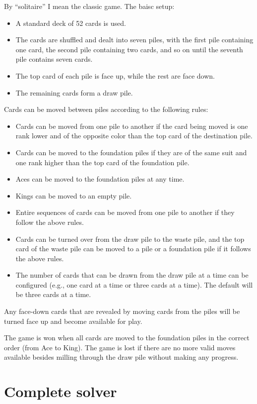 \documentclass[11pt]{article}
\begin{document}
By ``solitaire'' I mean the classic game. 
The baisc setup:
\begin{itemize}
    \item A standard deck of 52 cards is used.
    \item The cards are shuffled and dealt into seven piles, with the first pile containing one card, the second pile containing two cards, and so on until the seventh pile contains seven cards. 
    \item The top card of each pile is face up, while the rest are face down.
    \item The remaining cards form a draw pile.
\end{itemize}
Cards can be moved between piles according to the following rules:
\begin{itemize}
    \item Cards can be moved from one pile to another if the card being moved is one rank lower and of the opposite color than the top card of the destination pile. 
    \item Cards can be moved to the foundation piles if they are of the same suit and one rank higher than the top card of the foundation pile. 
    \item Aces can be moved to the foundation piles at any time.
    \item Kings can be moved to an empty pile.
    \item Entire sequences of cards can be moved from one pile to another if they follow the above rules.
    \item Cards can be turned over from the draw pile to the waste pile, and the top card of the waste pile can be moved to a pile or a foundation pile if it follows the above rules.
    \item The number of cards that can be drawn from the draw pile at a time can be configured (e.g., one card at a time or three cards at a time). 
    The default will be three cards at a time.
\end{itemize}
Any face-down cards that are revealed by moving cards from the piles will be turned face up and become available for play.

The game is won when all cards are moved to the foundation piles in the correct order (from Ace to King).
The game is lost if there are no more valid moves available besides milling through the draw pile without making any progress.

\section{Complete solver}
\end{document}
